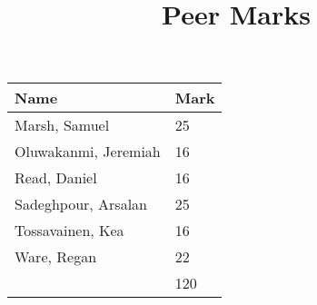 \documentclass[11pt]{article}
\title{Peer Marks}
\date{}
\begin{document}
\maketitle

\begin{longtable}[c]{@{} l l @{}}
\toprule
Name & Mark \tabularnewline
\midrule
Marsh, Samuel & 25 \tabularnewline
Oluwakanmi, Jeremiah & 16 \tabularnewline
Read, Daniel & 16 \tabularnewline
Sadeghpour, Arsalan & 25 \tabularnewline
Tossavainen, Kea & 16 \tabularnewline
Ware, Regan & 22 \tabularnewline
\midrule
& 120 \tabularnewline
\bottomrule
\end{longtable}
\end{document}
